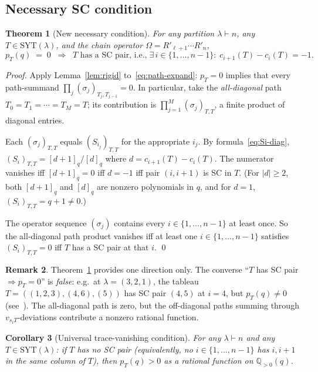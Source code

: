 \documentclass[11pt]{article}
\newtheorem{theorem}{Theorem}
\newtheorem{corollary}[theorem]{Corollary}
\theoremstyle{definition}
\newtheorem{remark}[theorem]{Remark}
\newcommand{\Om}{\Omega}
\newcommand{\Rp}{{R'}}
\newcommand{\SYT}{\mathrm{SYT}}
\newcommand{\pT}{p_T}
\newcommand{\qint}[1]{[#1]_q}
\begin{document}
\subsection{Necessary SC condition}

\begin{theorem}[New necessary condition]\label{thm:scnec}
For any partition $\lambda \vdash n$, any $T \in \SYT(\lambda)$, and the
chain operator $\Om = \Rp_{\ell+1} \cdots \Rp_n$,
\[
   \pT(q) \;=\; 0
   \;\;\Longrightarrow\;\;
   T \text{ has a SC pair, i.e.,}
   \;\exists\, i \in \{1, \ldots, n-1\}: \;
   c_{i+1}(T) - c_i(T) = -1.
\]
\end{theorem}

\begin{proof}
Apply Lemma~\ref{lem:rigid} to~\eqref{eq:path-expand}: $\pT = 0$ implies
that every path-summand
$\prod_j (\sigma_j)_{T_j, T_{j-1}} = 0$. In particular, take the
\emph{all-diagonal} path $T_0 = T_1 = \cdots = T_M = T$; its contribution
is $\prod_{j=1}^M (\sigma_j)_{T,T}$, a finite product of diagonal entries.

Each $(\sigma_j)_{T,T}$ equals $(S_{i_j})_{T,T}$ for the appropriate $i_j$.
By formula~\eqref{eq:Si-diag}, $(S_i)_{T,T} = \qint{d+1}/\qint{d}$ where
$d = c_{i+1}(T) - c_i(T)$. The numerator vanishes iff $\qint{d+1} = 0$ iff
$d = -1$ iff pair $(i, i+1)$ is SC in $T$. (For $|d| \ge 2$, both
$\qint{d+1}$ and $\qint{d}$ are nonzero polynomials in $q$, and for
$d = 1$, $(S_i)_{T,T} = q+1 \ne 0$.)

The operator sequence $(\sigma_j)$ contains every $i \in \{1, \ldots, n-1\}$
at least once. So the all-diagonal path product vanishes iff at least one
$i \in \{1, \ldots, n-1\}$ satisfies $(S_i)_{T,T} = 0$ iff $T$ has a SC
pair at that $i$. \qed
\end{proof}

\begin{remark}\label{rem:notconverse}
Theorem~\ref{thm:scnec} provides one direction only. The converse
``$T$ has SC pair $\Rightarrow \pT = 0$'' is \emph{false}: e.g.\ at
$\lambda = (3,2,1)$, the tableau $T = ((1,2,3),(4,6),(5))$ has SC pair
$(4, 5)$ at $i = 4$, but $\pT(q) \ne 0$ (see~\cite{convPerSyt}). The
all-diagonal path is zero, but the off-diagonal paths summing through
$v_{s_i T}$-deviations contribute a nonzero rational function.
\end{remark}

\begin{corollary}[Universal trace-vanishing condition]\label{cor:trv}
For any $\lambda \vdash n$ and any $T \in \SYT(\lambda)$: if $T$ has no
SC pair (equivalently, no $i \in \{1, \ldots, n-1\}$ has $i, i+1$ in
the same column of $T$), then $\pT(q) > 0$ as a rational function on
$\mathbb{Q}_{> 0}(q)$.
\end{corollary}
\end{document}
